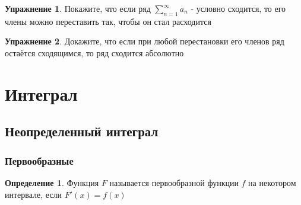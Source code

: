 \documentclass[a4paper]{article}
\theoremstyle{definition}
\newtheorem*{definition*}{Определение}
\newtheorem*{upr}{Упражнение}
\numberwithin{theorem}{subsection}
\numberwithin{lemma}{subsection}
\numberwithin{definition}{subsection}
\numberwithin{comment*}{subsection}
\numberwithin{consequence}{subsection}
\numberwithin{property}{subsection}
\begin{document}
\begin{upr}
 Покажите, что если ряд $\sum_{n=1}^{\infty}{a_n}$ - условно сходится, то его члены можно переставить так, чтобы он стал расходится
\end{upr}
\begin{upr}
 Докажите, что если при любой перестановки его членов ряд остаётся сходящимся, то ряд сходится абсолютно
\end{upr}

\section{Интеграл}
\subsection{Неопределенный интеграл}
\subsubsection{Первообразные}
\begin{definition*}
 Функция $F$ называется первообразной функции $f$ на некотором интервале, если $F'(x) = f(x)$
\end{definition*}
\end{document}
